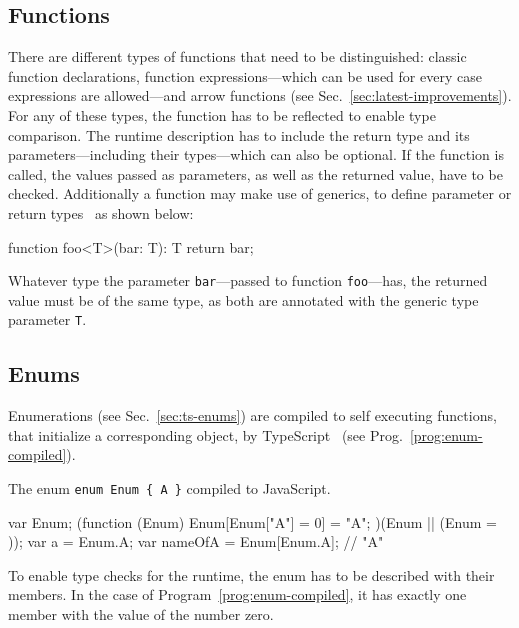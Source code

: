 
\subsection{Functions}

There are different types of functions that need to be distinguished: classic function declarations, function expressions---which can be used for every case expressions are allowed---and arrow functions (see Sec.~\ref{sec:latest-improvements}). For any of these types, the function has to be reflected to enable type comparison. The runtime description has to include the return type and its parameters---including their types---which can also be optional. If the function is called, the values passed as parameters, as well as the returned value, have to be checked. Additionally a function may make use of generics, to define parameter or return types~\cite{TypeScriptHandbook:Generics} as shown below:
\begin{JsCode}[numbers=none]
function foo<T>(bar: T): T {
  return bar;
} 
\end{JsCode}
Whatever type the parameter \texttt{bar}---passed to function \texttt{foo}---has, the returned value must be of the same type, as both are annotated with the generic type parameter \texttt{T}.

\subsection{Enums}

Enumerations (see Sec.~\ref{sec:ts-enums}) are compiled to self executing functions, that initialize a corresponding object, by TypeScript~\cite{TypeScriptHandbook:Enums} (see Prog.~\ref{prog:enum-compiled}).
\begin{program}
\caption{The enum \texttt{enum Enum \{ A \}} compiled to JavaScript.~\cite{TypeScriptHandbook:Enums}}
\label{prog:enum-compiled}
\begin{JsCode}
var Enum;
(function (Enum) {
    Enum[Enum["A"] = 0] = "A";
})(Enum || (Enum = {}));
var a = Enum.A;
var nameOfA = Enum[Enum.A]; // "A"
\end{JsCode}
\end{program}
To enable type checks for the runtime, the enum has to be described with their members. In the case of Program~\ref{prog:enum-compiled}, it has exactly one member with the value of the number zero.

